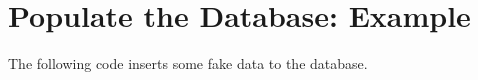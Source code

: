 \section{Populate the Database: Example}
The following code inserts some fake data to the database.

